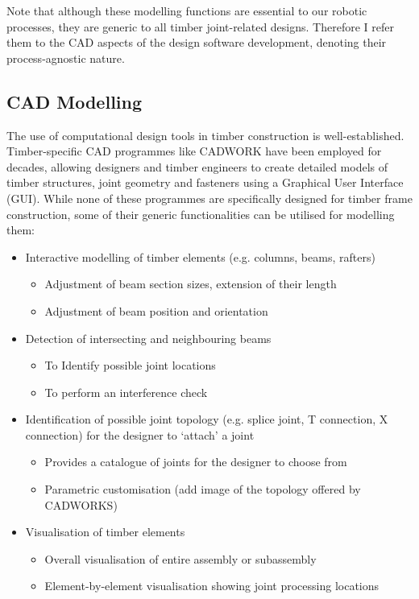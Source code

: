 Note that although these modelling functions are essential to our robotic processes, they are generic to all timber joint-related designs. Therefore I refer them to the CAD aspects of the design software development, denoting their process-agnostic nature.

\subsection{CAD Modelling}
The use of computational design tools in timber construction is well-established. Timber-specific CAD programmes like CADWORK have been employed for decades, allowing designers and timber engineers to create detailed models of timber structures, joint geometry and fasteners using a Graphical User Interface (GUI). 
While none of these programmes are specifically designed for timber frame construction, some of their generic functionalities can be utilised for modelling them:
\begin{itemize}
    \item Interactive modelling of timber elements (e.g. columns, beams, rafters)
    \begin{itemize}
        \item Adjustment of beam section sizes, extension of their length
        \item Adjustment of beam position and orientation
    \end{itemize}
    \item Detection of intersecting and neighbouring beams
    \begin{itemize}
        \item To Identify possible joint locations
        \item To perform an interference check
    \end{itemize}
    \item Identification of possible joint topology (e.g. splice joint, T connection, X connection) for the designer to ‘attach’ a joint
    \begin{itemize}
        \item Provides a catalogue of joints for the designer to choose from
        \item Parametric customisation (add image of the topology offered by CADWORKS)
    \end{itemize}
     \item Visualisation of timber elements
    \begin{itemize}
        \item Overall visualisation of entire assembly or subassembly
        \item Element-by-element visualisation showing joint processing locations
    \end{itemize}
\end{itemize}

